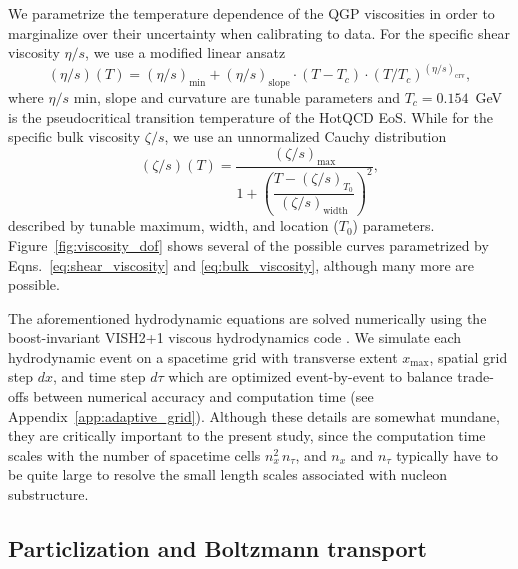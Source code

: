 \documentclass[aps,prc,reprint,amsmath,nofootinbib]{revtex4-1}
\begin{document}
We parametrize the temperature dependence of the QGP viscosities in order to marginalize over their uncertainty when calibrating to data.
For the specific shear viscosity $\eta/s$, we use a modified linear ansatz
\begin{equation}
  \label{eq:shear_viscosity}
  (\eta/s)(T) = (\eta/s)_\mathrm{min} + (\eta/s)_\mathrm{slope}\cdot(T - T_c)\cdot(T/T_c)^{(\eta/s)_\mathrm{crv}},
\end{equation}
where $\eta/s$ min, slope and curvature are tunable parameters and $T_c=0.154$~GeV is the pseudocritical transition temperature of the HotQCD EoS.
While for the specific bulk viscosity $\zeta/s$, we use an unnormalized Cauchy distribution
\begin{equation}
  \label{eq:bulk_viscosity}
  (\zeta/s)(T) = \frac{(\zeta/s)_\mathrm{max}}{1 + \left(\dfrac{T - (\zeta/s)_{T_0}}{(\zeta/s)_\mathrm{width}}\right)^2},
\end{equation}
described by tunable maximum, width, and location ($T_0$) parameters.
Figure~\ref{fig:viscosity_dof} shows several of the possible curves parametrized by Eqns.~\eqref{eq:shear_viscosity} and \eqref{eq:bulk_viscosity}, although many more are possible.

The aforementioned hydrodynamic equations are solved numerically using the boost-invariant VISH2+1 viscous hydrodynamics code \cite{Song:2007ux, Shen:2014vra}.
We simulate each hydrodynamic event on a spacetime grid with transverse extent $x_\mathrm{max}$, spatial grid step $dx$, and time step $d\tau$ which are optimized event-by-event to balance trade-offs between numerical accuracy and computation time (see Appendix~\ref{app:adaptive_grid}).
Although these details are somewhat mundane, they are critically important to the present study, since the computation time scales with the number of spacetime cells $n_x^2\, n_\tau$, and $n_x$ and $n_\tau$ typically have to be quite large to resolve the small length scales associated with nucleon substructure.

\subsection{Particlization and Boltzmann transport}
\end{document}
